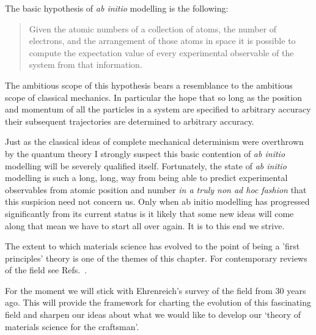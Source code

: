 The basic hypothesis of {\it ab initio} modelling is the following:  

\begin{quote}
Given the atomic numbers of a collection of atoms,
the number of electrons, and the arrangement of those atoms 
in space it is possible to compute
the expectation value of every experimental
observable of the system from that information.
\end{quote}

The ambitious scope of this hypothesis bears a resemblance 
to the ambitious scope of classical mechanics. In particular the hope 
that so long as the position and momentum of all the particles 
in a system are specified to arbitrary accuracy their subsequent 
trajectories are determined to arbitrary accuracy. 

Just as the classical ideas of complete mechanical determinism were
overthrown by the quantum theory I strongly suspect this
basic contention of {\it ab initio} modelling will be severely qualified itself. 
Fortunately, the state of {\it ab initio} modelling is such a long, long, way from being
able to predict experimental observables from atomic position and number
{\it in a truly non ad hoc fashion} that this suspicion need not concern us. 
Only when ab initio modelling has progressed significantly from its current status 
is it likely that some new ideas will come along that mean 
we have to start all over again. It is to this end we strive.

The extent to which materials science has evolved to the point of being 
a 'first principles' theory is one of the themes of 
this chapter. For contemporary reviews of the field see Refs.~\cite{finnis12, ismailbeigi2017}.
%
%

For the moment we will stick with Ehrenreich's survey of the field from 30 years ago. 
This will provide the framework 
for charting the evolution of this fascinating field and sharpen our ideas about 
what we would like to develop our `theory of materials science for the craftsman'.

